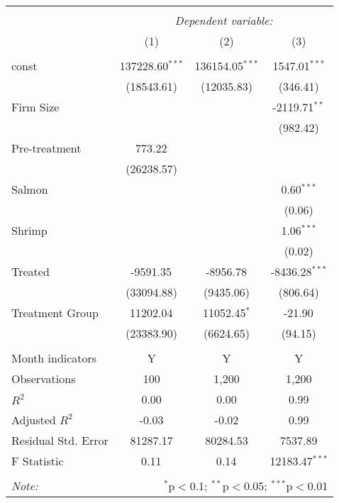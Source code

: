 \begin{table}[!htbp] \centering
\begin{tabular}{@{\extracolsep{5pt}}lccc}
\\[-1.8ex]\hline
\hline \\[-1.8ex]
& \multicolumn{3}{c}{\textit{Dependent variable:}} \
\cr \cline{3-4}
\\[-1.8ex] & (1) & (2) & (3) \\
\hline \\[-1.8ex]
 const & 137228.60$^{***}$ & 136154.05$^{***}$ & 1547.01$^{***}$ \\
  & (18543.61) & (12035.83) & (346.41) \\
 Firm Size & & & -2119.71$^{**}$ \\
  & & & (982.42) \\
 Pre-treatment & 773.22$^{}$ & & \\
  & (26238.57) & & \\
 Salmon & & & 0.60$^{***}$ \\
  & & & (0.06) \\
 Shrimp & & & 1.06$^{***}$ \\
  & & & (0.02) \\
 Treated & -9591.35$^{}$ & -8956.78$^{}$ & -8436.28$^{***}$ \\
  & (33094.88) & (9435.06) & (806.64) \\
 Treatment Group & 11202.04$^{}$ & 11052.45$^{*}$ & -21.90$^{}$ \\
  & (23383.90) & (6624.65) & (94.15) \\
\hline \\[-1.8ex]
 Month indicators & Y & Y & Y \\
 Observations & 100 & 1,200 & 1,200 \\
 $R^2$ & 0.00 & 0.00 & 0.99 \\
 Adjusted $R^2$ & -0.03 & -0.02 & 0.99 \\
 Residual Std. Error & 81287.17 & 80284.53 & 7537.89  \\
 F Statistic & 0.11$^{}$  & 0.14$^{}$  & 12183.47$^{***}$  \\
\hline
\hline \\[-1.8ex]
\textit{Note:} & \multicolumn{3}{r}{$^{*}$p$<$0.1; $^{**}$p$<$0.05; $^{***}$p$<$0.01} \\
\end{tabular}
\end{table}